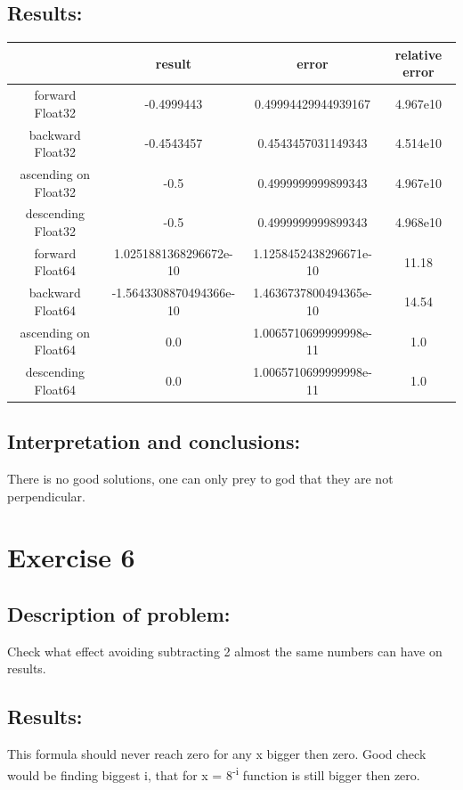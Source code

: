 \documentclass{article}
\begin{document}
\subsection*{Results:}
\begin{center}
    \begin{tabular}{| c | c | c | c |}
        \hline
         & result & error & relative error\\ 
        \hline
        forward Float32 & -0.4999443 & 0.49994429944939167 & 4.967e10\\
        backward Float32 & -0.4543457 & 0.4543457031149343 & 4.514e10\\
        ascending on Float32 & -0.5 & 0.4999999999899343 & 4.967e10\\
        descending Float32 & -0.5 & 0.4999999999899343 & 4.968e10\\
        \hline
        forward Float64 & 1.0251881368296672e-10 & 1.1258452438296671e-10 & 11.18 \\
        backward Float64 & -1.5643308870494366e-10 & 1.4636737800494365e-10 & 14.54 \\
        ascending on Float64 & 0.0 & 1.0065710699999998e-11 & 1.0 \\
        descending Float64 & 0.0 & 1.0065710699999998e-11 & 1.0\\
        \hline
    \end{tabular}
    \end{center}

\subsection*{Interpretation and conclusions:}
There is no good solutions, one can only prey to god that they are not perpendicular.

\section*{Exercise 6}
\subsection*{Description of problem:}
Check what effect avoiding subtracting 2 almost the same numbers can have on results.

\subsection*{Results:}
This formula should never reach zero for any x bigger then zero. Good check would be finding biggest i, that for x = 8\textsuperscript{-i} function is still bigger then zero.
\end{document}
